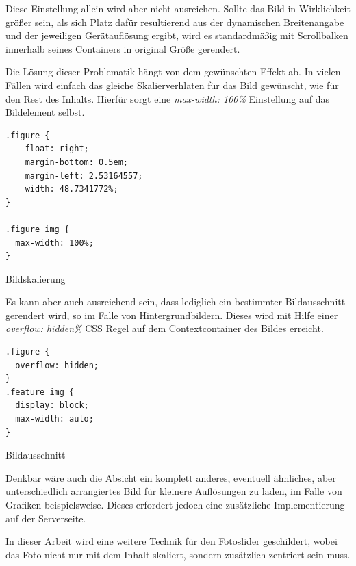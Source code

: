 Diese Einstellung allein wird aber nicht ausreichen. Sollte das Bild in Wirklichkeit größer sein, als sich Platz dafür resultierend aus der dynamischen Breitenangabe und der jeweiligen Gerätauflösung ergibt, wird es standardmäßig mit Scrollbalken innerhalb seines Containers in original Größe gerendert.

Die Lösung dieser Problematik hängt von dem gewünschten Effekt ab. In vielen Fällen wird einfach das gleiche Skalierverhlaten für das Bild gewünscht, wie für den Rest des Inhalts. Hierfür sorgt eine \emph{max-width: 100\%} Einstellung auf das Bildelement selbst.

\begin{listing}[H]
\begin{verbatim}
.figure {
    float: right;
    margin-bottom: 0.5em;
    margin-left: 2.53164557;
    width: 48.7341772%;
}

.figure img {
  max-width: 100%;
}
\end{verbatim}
\caption{Bildskalierung}
\label{lst:scalable_image}
\end{listing}


Es kann aber auch ausreichend sein, dass lediglich ein bestimmter Bildausschnitt gerendert wird, so im Falle von Hintergrundbildern. Dieses wird mit Hilfe einer \emph{overflow: hidden\%} CSS Regel auf dem Contextcontainer des Bildes erreicht.

\begin{listing}[H]
\begin{verbatim}
.figure {
  overflow: hidden;
}
.feature img {
  display: block;
  max-width: auto;
}
\end{verbatim}
\caption{Bildausschnitt}
\label{lst:cropped_image}
\end{listing}

Denkbar wäre auch die Absicht ein komplett anderes, eventuell ähnliches, aber unterschiedlich arrangiertes Bild für kleinere Auflösungen zu laden, im Falle von Grafiken beispielsweise. Dieses erfordert jedoch eine zusätzliche Implementierung auf der Serverseite.

In dieser Arbeit wird eine weitere Technik für den Fotoslider geschildert, wobei das Foto nicht nur mit dem Inhalt skaliert, sondern zusätzlich zentriert sein muss.


